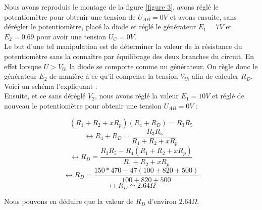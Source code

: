 Nous avons reproduis le montage de la figure \ref{figure 3}, avons réglé le potentiomètre pour obtenir une tension de $U_{AB}=0V$ et avons ensuite, sans dérégler le potentiomètre, placé la diode et réglé le générateur $E_1 = 7V$ et $ E_2 = 0.69 $ pour avoir une tension $U_C = 0V$. 
\\

Le but d'une tel manipulation est de déterminer la valeur de la résistance du potentiomètre sans la
connaître par équilibrage des deux branches du circuit, En effet lorsque $U > V_{th}$ la diode se comporte
comme un générateur. On règle donc le générateur $E_2$ de manière à ce qu’il compense la tension $V_{th}$
afin de calculer $R_D$. Voici un schéma l'expliquant : 
\\

Ensuite, et ce sans déréglé $V_2$, nous avons réglé la valeur $E_1 = 10V$ et réglé de nouveau le potentiomètre pour obtenir une tension $ U_{AB}=0V$ :

\[(R_1+R_2+xR_p)(R_4+R_D)=R_3R_5\]
\[\leftrightarrow R_4+R_D = \frac{R_3R_5}{R_1+R_2+xR_p}\]
\[\leftrightarrow R_D = \frac{R_3R_5-R_4(R_1+R_2+xR_p)}{R_1+R_2+xR_p}\]
\[\leftrightarrow R_D = \frac{150*470-47(100+820+500)}{100+820+500}\]
\[\leftrightarrow R_D \simeq  2.64\Omega\]

Nous pouvons en déduire que la valeur de $R_D$ d'environ $2.64\Omega$.